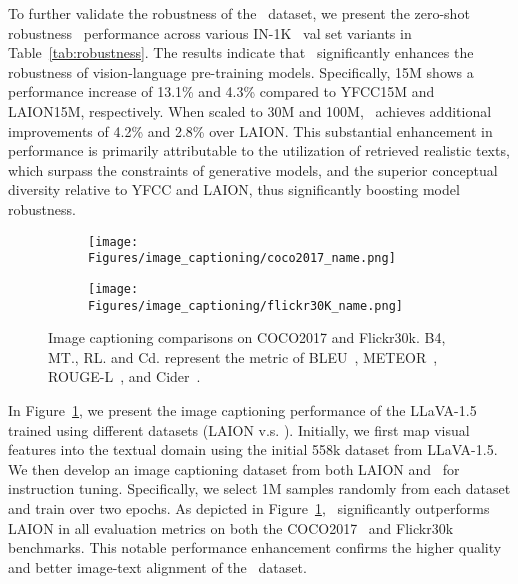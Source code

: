  To further validate the robustness of the \dsname\ dataset, we present the zero-shot robustness~\cite{CLIP} performance across various IN-1K~\cite{ImageNet} val set variants in Table~\ref{tab:robustness}. The results indicate that \dsname\ significantly enhances the robustness of vision-language pre-training models. Specifically, \dsname15M shows a performance increase of 13.1\% and 4.3\% compared to YFCC15M and LAION15M, respectively. When scaled to 30M and 100M, \dsname\ achieves additional improvements of 4.2\% and 2.8\% over LAION. This substantial enhancement in performance is primarily attributable to the utilization of retrieved realistic texts, which surpass the constraints of generative models, and the superior conceptual diversity relative to YFCC and LAION, thus significantly boosting model robustness.



\begin{figure}[!t]
\centering
    \begin{subfigure}{0.22\textwidth}
    \texttt{[image: Figures/image\_captioning/coco2017\_name.png]}
    \end{subfigure}
    \begin{subfigure}{0.22\textwidth}
    \texttt{[image: Figures/image\_captioning/flickr30K\_name.png]}
    \end{subfigure}
\vspace{-3mm}
\caption{Image captioning comparisons on COCO2017 and Flickr30k. B4, MT., RL. and Cd. represent the metric of BLEU~\cite{BLEU}, METEOR~\cite{METEOR}, ROUGE-L~\cite{METEOR}, and Cider~\cite{cider}.}
\vspace{-3mm}
\label{image_captioning}
\end{figure}

 In Figure~\ref{image_captioning}, we present the image captioning performance of the LLaVA-1.5~\cite{llava1.5} trained using different datasets (LAION v.s. \dsname). Initially, we first map visual features into the textual domain using the initial 558k dataset from LLaVA-1.5. We then develop an image captioning dataset from both LAION and \dsname\ for instruction tuning. Specifically, we select 1M samples randomly from each dataset and train over two epochs. As depicted in Figure~\ref{image_captioning}, \dsname\ significantly outperforms LAION in all evaluation metrics on both the COCO2017~\cite{mscoco_retrieval} and Flickr30k~\cite{flickr30k} benchmarks. This notable performance enhancement confirms the higher quality and better image-text alignment of the \dsname\ dataset.


